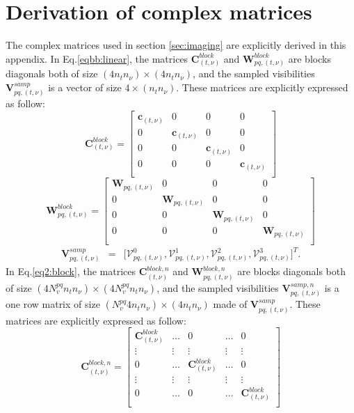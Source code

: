 \documentclass[useAMS,usenatbib]{mn2e}
\begin{document}
\section[]{Derivation of complex matrices}
\label{app:complexmatrices}
The complex matrices used in section \ref{sec:imaging} are explicitly derived in this appendix. In Eq.\ref{eqbb:linear}, the matrices
$\mathbf{C}_{(t,\nu)}^{block}$ and $\mathbf{W}_{pq,(t,\nu)}^{block}$ are blocks diagonals  both of size $(4n_t n_{\nu})\times(4n_t 
n_{\nu})$, and  the sampled visibilities $\mathbf{V}_{pq,(t,\nu)}^{samp}$ is a vector of size $4\times (n_t n_{\nu})$. These matrices are 
explicitly expressed as follow:
\begin{equation*}
\mathbf{C}_{(t,\nu)}^{block}=
  \begin{bmatrix}
    \mathbf{c}_{(t,\nu)} & 0 & 0 & 0\\
    0 &  \mathbf{c}_{(t,\nu)} &0 & 0 \\
    0 & 0 & \mathbf{c}_{(t,\nu)} & 0\\
      0 & 0 & 0 & \mathbf{c}_{(t,\nu)}\\
  \end{bmatrix}
\end{equation*}
\begin{equation*}
\mathbf{W}_{pq,(t,\nu)}^{block}=
  \begin{bmatrix}
    \mathbf{W}_{pq,(t,\nu)}& 0 & 0 & 0\\
    0 &  \mathbf{W}_{pq,(t,\nu)} &0 & 0 \\
    0 & 0 & \mathbf{W}_{pq,(t,\nu)} & 0\\
      0 & 0 & 0 & \mathbf{W}_{pq,(t,\nu)}\\
  \end{bmatrix}
\end{equation*}
\begin{eqnarray*}
\mathbf{V}_{pq,(t,\nu)}^{samp}&=&\Bigg[\mathcal{V}_{pq,(t,\nu)}^{0},\mathcal{ V } 
^1_{pq,(t,\nu)},\mathcal{V}^2_{pq,(t,\nu)},\mathcal{V}_{pq,(t,\nu)}^{3 } \Bigg]^T. 
\end{eqnarray*}
In Eq.\ref{eq2:block}, the matrices $\mathbf{C}_{(t,\nu)}^{block,n}$ and 
$\mathbf{W}_{pq,(t,\nu)}^{block,n}$ are blocks diagonals both of size $(4N_v^{pq}n_t n_{\nu})\times (4N_v^{pq}n_t n_{\nu})$, and 
the sampled visibilities $\mathbf{V}_{pq,(t,\nu)}^{samp,n}$ is a one row matrix of size $(N_v^{pq}4 n_t n_{\nu})\times (4 n_t n_{\nu})$ 
made of $\textbf{V}_{pq,(t,\nu)}^{samp}$. These matrices are explicitly expressed as follow:
\begin{equation*}
\mathbf{C}_{(t,\nu)}^{block,n}=
  \begin{bmatrix}
    \mathbf{C}_{(t,\nu)}^{block} &\dots & 0 & \dots & 0\\
    \vdots & \vdots & \vdots & \vdots & \vdots\\
    0 & \dots& \mathbf{C}_{(t,\nu)}^{block} &\dots & 0\\
    \vdots & \vdots & \vdots & \vdots & \vdots \\
    0 & \dots& 0 &\dots & \mathbf{C}_{(t,\nu)}^{block}\\
  \end{bmatrix}
\end{equation*}
\end{document}
